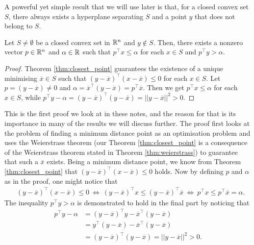 %
A powerful yet simple result that we will use later is that, for a closed convex set $S$, there always exists a hyperplane separating $S$ and a point $y$ that does not belong to $S$.
\begin{theorem}\label{thm:separation}
Let $S \neq \emptyset$ be a closed convex set in $\mathbb{R}^n$ and $y \notin S$. Then, there exists a nonzero vector $p \in \mathbb{R}^n$ and $\alpha \in \mathbb{R}$ such that $p^\top x \leq \alpha$ for each $x \in S$ and $p^\top y > \alpha$.
\end{theorem}
%
\begin{proof}
	Theorem \ref{thm:closest_point} guarantees the existence of a unique minimising $\overline{x} \in S$ such that $(y-\overline{x})^\top(x - \overline{x}) \leq 0$ for each $x \in S$. Let $p = (y - \overline{x}) \neq 0$ and $\alpha = \overline{x}^\top(y - \overline{x}) = p^\top\overline{x}$. Then we get $p^\top x \leq \alpha$ for each $x \in S$, while $p^\top y - \alpha = (y - \overline{x})^\top(y - \overline{x}) = ||y - \overline{x}||^2 > 0$.
\end{proof}

This is the first proof we look at in these notes, and the reason for that is its importance in many of the results we will discuss further. The proof first looks at the problem of finding a minimum distance point as an optimisation problem and uses the Weierstrass theorem (our Theorem \ref{thm:closest_point} is a consequence of the Weierstrass theorem stated in Theorem \ref{thm:weierstrass}) to guarantee that such a $\overline{x}$ exists. Being a minimum distance point, we know from Theorem \ref{thm:closest_point} that $(y-\overline{x})^\top(x - \overline{x}) \leq 0$ holds. Now by defining $p$ and $\alpha$ as in the proof, one might notice that
%
\begin{align*}
	& (y-\overline{x})^\top(x - \overline{x}) \leq 0 \ \Leftrightarrow \ 
	(y-\overline{x})^\top x \leq (y - \overline{x})^\top\overline{x} \ \Leftrightarrow \ 
	p^\top x \leq p^\top\overline{x} = \alpha. 
\end{align*}
%
The inequality $p^\top y > \alpha$ is demonstrated to hold in the final part by noticing that 
%
\begin{align*}
	p^\top y - \alpha &= 
	(y - \overline{x})^\top y - \overline{x}^\top(y - \overline{x}) \\ &= 
	y^\top(y - \overline{x}) - \overline{x}^\top(y - \overline{x}) \\ & = (y - \overline{x})^\top (y - \overline{x}) = || y - \overline{x} ||^2 > 0.
\end{align*}

